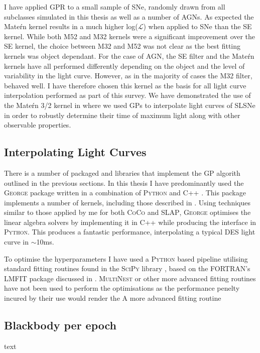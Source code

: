 I have applied GPR to a small sample of SNe, randomly drawn from all subclasses simulated in this thesis as well as a number of AGNs. As expected the Mate\'rn kernel results in a much higher log($\mathcal{L}$) when applied to SNe than the SE kernel. While both M52 and M32 kernels were a significant improvement over the SE kernel, the choice between M32 and M52 was not clear as the best fitting kernels was object dependant. For the case of AGN, the SE filter and the Mate\'rn kernels have all performed differently depending on the object and the level of variability in the light curve. However, as in the majority of cases the M32 filter, behaved  well. I have therefore chosen this kernel as the basis for all light curve interpolation performed as part of this survey. We have demonstrated the use of the Mate\'rn 3/2 kernel in \citet{Inserra2018} where we used GPs to interpolate light curves of SLSNe in order to robustly determine their time of maximum light along with other observable properties.

\subsection{Interpolating Light Curves}
There is a number of packaged and libraries that implement the GP algorith outlined in the previous sections. In this thesis I have predominantly used the \textsc{George} package written in a combination of \textsc{Python} and \textsc{C++} \citep{Ambikasaran2014}. This package implements a number of kernels, including those described in . Using techniques similar to those applied by me for both \textsc{CoCo} and \textsc{SLAP}, \textsc{George} optimises the linear algebra solvers by implementing it in \textsc{C++} while producing the interface in \textsc{Python}. This produces a fantastic performance, interpolating a typical DES light curve in $\sim$10ms.

To optimise the hyperparameters I have used a \textsc{Python} based pipeline utilising standard fitting routines found in the \textsc{SciPy} library \citep{Oliphant2007}, based on the \textsc{FORTRAN}'s \textsc{LMFIT} package discussed in . \textsc{MultiNest} or other more advanced fitting routines have not been used to perform the optimisations as the performance penelty incured by their use would render the  A more advanced fitting routine

\subsection{Blackbody per epoch}
text
